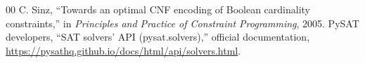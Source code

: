 \documentclass[a4paper,fleqn]{cas-sc}
\begin{document}
\begin{thebibliography}{00}
 C. Sinz, ``Towards an optimal CNF encoding of Boolean
cardinality constraints,'' in \emph{Principles and Practice of Constraint
Programming}, 2005.
 PySAT developers, ``SAT solvers' API (pysat.solvers),'' official
documentation, \url{https://pysathq.github.io/docs/html/api/solvers.html}.
\end{thebibliography}
\end{document}
